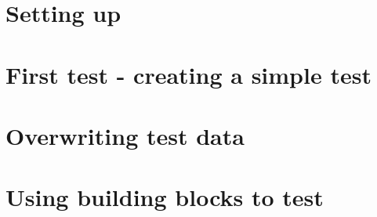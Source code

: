 


\section{Setting up}

\clearpage
\section{First test -  creating a simple test}

\clearpage
\section{Overwriting test data}

\clearpage
\section{Using building blocks to test}

